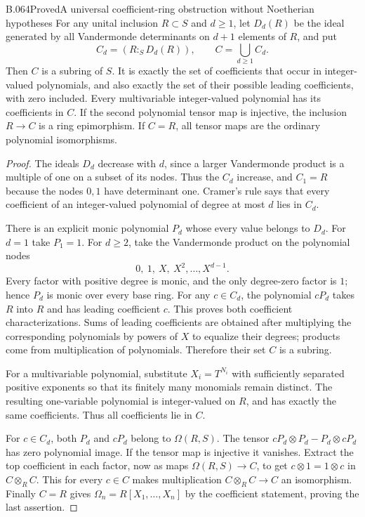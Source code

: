\begin{saresult}{B.064}{Proved}{A universal coefficient-ring obstruction without Noetherian hypotheses}
For any unital inclusion $R\subset S$ and $d\ge1$,
let $D_d(R)$ be the ideal generated by all
Vandermonde determinants on $d+1$ elements of $R$,
and put
\[
 C_d=(R:_S D_d(R)),\qquad C=\bigcup_{d\ge1}C_d.           \tag{B64.1}
\]
Then $C$ is a subring of $S$. It is exactly the
set of coefficients that occur in integer-valued
polynomials, and also exactly the set of their
possible leading coefficients, with zero included. Every multivariable
integer-valued polynomial has its coefficients in
$C$. If the second polynomial tensor map is
injective, the inclusion $R\to C$ is a ring
epimorphism. If $C=R$, all tensor maps are the
ordinary polynomial isomorphisms.
\end{saresult}
\begin{proof}
The ideals $D_d$ decrease with $d$, since a
larger Vandermonde product is a multiple of
one on a subset of its nodes. Thus the $C_d$
increase, and $C_1=R$ because the nodes $0,1$
have determinant one.
Cramer's rule says that every coefficient of
an integer-valued polynomial of degree at most
$d$ lies in $C_d$.

There is an explicit monic polynomial $P_d$
whose every value belongs to $D_d$. For $d=1$
take $P_1=1$. For $d\ge2$, take the Vandermonde
product on the polynomial nodes
\[
                     0,\ 1,\ X,\ X^2,\ldots,X^{d-1}.
\]
Every factor with positive degree is monic,
and the only degree-zero factor is $1$; hence
$P_d$ is monic over every base ring.
For any $c\in C_d$, the polynomial $cP_d$
takes $R$ into $R$ and has leading coefficient
$c$. This proves both coefficient characterizations.
Sums of leading coefficients are obtained after
multiplying the corresponding polynomials by
powers of $X$ to equalize their degrees; products
come from multiplication of polynomials.
Therefore their set $C$ is a subring.

For a multivariable polynomial, substitute
$X_i=T^{N_i}$ with sufficiently separated
positive exponents so that its finitely many
monomials remain distinct. The resulting
one-variable polynomial is integer-valued on
$R$, and has exactly the same coefficients.
Thus all coefficients lie in $C$.

For $c\in C_d$, both $P_d$ and $cP_d$ belong
to $\Omega(R,S)$. The tensor
$cP_d\otimes P_d-P_d\otimes cP_d$ has zero
polynomial image. If the tensor map is
injective it vanishes. Extract the top
coefficient in each factor, now as maps
$\Omega(R,S)\to C$, to get
$c\otimes1=1\otimes c$ in $C\otimes_R C$.
This for every $c\in C$ makes multiplication
$C\otimes_R C\to C$ an isomorphism.
Finally $C=R$ gives $\Omega_n=R[X_1,\ldots,X_n]$
by the coefficient statement, proving the
last assertion.
\end{proof}

